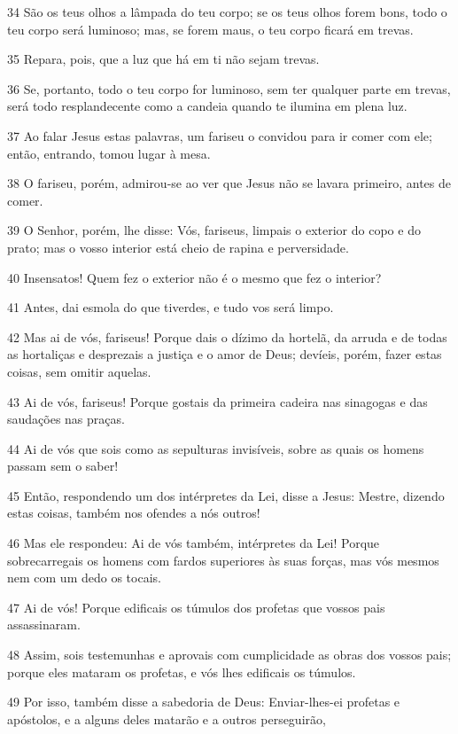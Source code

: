 \par 34 São os teus olhos a lâmpada do teu corpo; se os teus olhos forem bons, todo o teu corpo será luminoso; mas, se forem maus, o teu corpo ficará em trevas.
\par 35 Repara, pois, que a luz que há em ti não sejam trevas.
\par 36 Se, portanto, todo o teu corpo for luminoso, sem ter qualquer parte em trevas, será todo resplandecente como a candeia quando te ilumina em plena luz.
\par 37 Ao falar Jesus estas palavras, um fariseu o convidou para ir comer com ele; então, entrando, tomou lugar à mesa.
\par 38 O fariseu, porém, admirou-se ao ver que Jesus não se lavara primeiro, antes de comer.
\par 39 O Senhor, porém, lhe disse: Vós, fariseus, limpais o exterior do copo e do prato; mas o vosso interior está cheio de rapina e perversidade.
\par 40 Insensatos! Quem fez o exterior não é o mesmo que fez o interior?
\par 41 Antes, dai esmola do que tiverdes, e tudo vos será limpo.
\par 42 Mas ai de vós, fariseus! Porque dais o dízimo da hortelã, da arruda e de todas as hortaliças e desprezais a justiça e o amor de Deus; devíeis, porém, fazer estas coisas, sem omitir aquelas.
\par 43 Ai de vós, fariseus! Porque gostais da primeira cadeira nas sinagogas e das saudações nas praças.
\par 44 Ai de vós que sois como as sepulturas invisíveis, sobre as quais os homens passam sem o saber!
\par 45 Então, respondendo um dos intérpretes da Lei, disse a Jesus: Mestre, dizendo estas coisas, também nos ofendes a nós outros!
\par 46 Mas ele respondeu: Ai de vós também, intérpretes da Lei! Porque sobrecarregais os homens com fardos superiores às suas forças, mas vós mesmos nem com um dedo os tocais.
\par 47 Ai de vós! Porque edificais os túmulos dos profetas que vossos pais assassinaram.
\par 48 Assim, sois testemunhas e aprovais com cumplicidade as obras dos vossos pais; porque eles mataram os profetas, e vós lhes edificais os túmulos.
\par 49 Por isso, também disse a sabedoria de Deus: Enviar-lhes-ei profetas e apóstolos, e a alguns deles matarão e a outros perseguirão,
